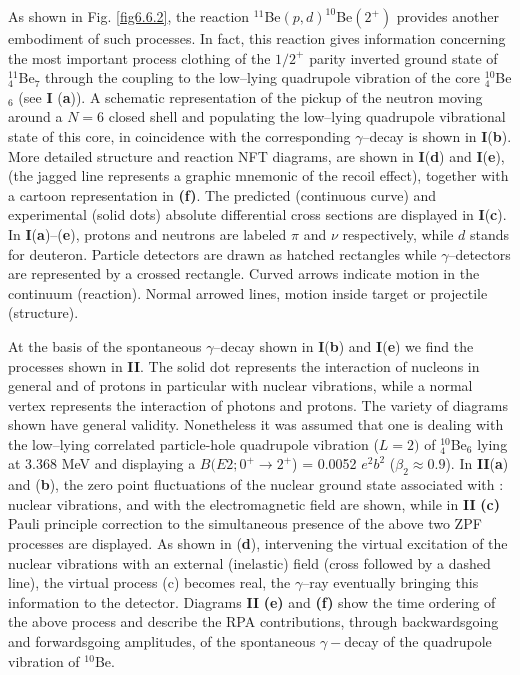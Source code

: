 As shown in Fig. \ref{fig6.6.2}, the reaction $^{11}$Be$(p,d)^{10}$Be$(2^+)$ provides another embodiment of such processes.  	 In fact, this reaction gives information concerning the most important process   clothing  of the $1/2^+$ parity inverted ground state of $^{11}_4$Be$_{7}$
  	through the coupling to the low--lying quadrupole vibration of the core $^{10}_4$Be$_6$ (see \textbf{I} (\textbf{a})). A schematic representation 
  	of the pickup of the neutron moving around a $N=6$ closed shell and populating the low--lying
  	quadrupole vibrational state of this core, in coincidence with the corresponding $\gamma$--decay is shown in \textbf{I}(\textbf{b}).  More  detailed structure and reaction NFT diagrams,  
  are	shown in  \textbf{I}(\textbf{d}) and \textbf{I}(\textbf{e}), (the jagged line represents 
  	  	a graphic mnemonic of the recoil effect),  together with a cartoon representation in {\bf (f)}. The predicted (continuous curve) and experimental
  	  	  	(solid dots) absolute differential cross sections   are displayed in \textbf{I}(\textbf{c}).
  In \textbf{I}(\textbf{a})--(\textbf{e}),	protons 
  	and neutrons are labeled $\pi$ and $\nu$ respectively, while $d$ stands for deuteron. Particle detectors are drawn as hatched rectangles while $\gamma$--detectors are represented by a crossed rectangle.
  	Curved arrows indicate  motion in the continuum (reaction). Normal arrowed 
  	lines, motion inside target or projectile (structure).  
  	
  	
  	At the basis of the spontaneous $\gamma$--decay shown in \textbf{I}(\textbf{b}) and \textbf{I}(\textbf{e}) we find the processes shown in \textbf{II}. The solid dot represents the  interaction of nucleons in general and of protons in particular  with nuclear vibrations, while a normal vertex represents the interaction of photons and protons.
  	The  variety of diagrams shown have general validity. Nonetheless it was assumed
  	 that one is dealing with the low--lying correlated particle-hole quadrupole vibration 
  	($L=2)$ of $^{10}_4$Be$_6$ lying at 3.368 MeV and displaying a  $B(E2; 0^+ \to 2^+$) = 0.0052 $e^2 b^2$  ($\beta_2 \approx 0.9$). In \textbf{II}(\textbf{a}) and (\textbf{b}), the  
  	zero point fluctuations of the nuclear ground state associated with :  nuclear
  	vibrations, and with the electromagnetic field are shown, while in \textbf{II} {\bf (c)} Pauli principle correction to the simultaneous presence 
  	of the above two ZPF processes are displayed. As shown in (\textbf{d}), intervening the virtual excitation of the nuclear vibrations with an external (inelastic) field  (cross followed by a dashed line), the virtual process (c) becomes real, the $\gamma$--ray eventually bringing this information to the detector. Diagrams \textbf{II} {\bf (e)} and \textbf{(f)} show the    time ordering of the 
  	above process and describe the  RPA contributions, through backwardsgoing and forwardsgoing amplitudes, of the spontaneous $\gamma-$decay of the quadrupole vibration of $^{10}$Be.
  	



